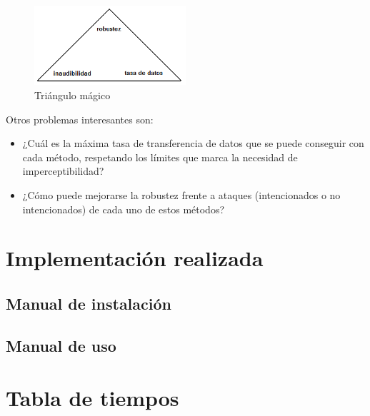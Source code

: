 \documentclass[12pt]{article}
\begin{document}
\begin{figure}[h]
  \centering
    \includegraphics[width=0.5\textwidth]{img/magictriangle}
  \caption{Triángulo mágico}
  \label{magictriangle}
\end{figure}

Otros problemas interesantes son:

\begin{itemize}

\item ¿Cuál es la máxima tasa de transferencia de datos que se puede conseguir con cada método, respetando los límites que marca la necesidad de imperceptibilidad?

\item ¿Cómo puede mejorarse la robustez frente a ataques (intencionados o no intencionados) de cada uno de estos métodos?

\end{itemize}

\newpage
\section{Implementación realizada}

\subsection{Manual de instalación}

\subsection{Manual de uso}

\newpage
\section{Tabla de tiempos}
\end{document}

